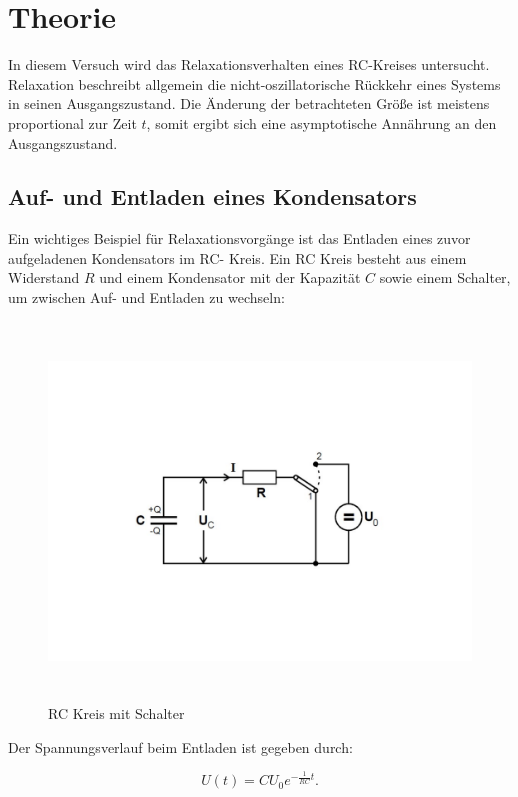 \section{Theorie}
\label{sec:Theorie}

In diesem Versuch wird das Relaxationsverhalten eines RC-Kreises untersucht.
Relaxation beschreibt allgemein die nicht-oszillatorische Rückkehr eines Systems in seinen Ausgangszustand.
Die Änderung der betrachteten Größe ist meistens proportional zur Zeit $t$, somit ergibt sich eine asymptotische
Annährung an den Ausgangszustand.

\subsection{Auf- und Entladen eines Kondensators}
Ein wichtiges Beispiel für Relaxationsvorgänge ist das Entladen eines zuvor aufgeladenen Kondensators im RC- Kreis.
Ein RC Kreis besteht aus einem Widerstand $R$ und einem Kondensator mit der Kapazität $C$ sowie einem Schalter, um zwischen 
Auf- und Entladen zu wechseln:

\begin{figure}
    \centering
    \includegraphics[height=10cm]{content/Theorie - RC-Kreis.pdf}
    \caption{RC Kreis mit Schalter}
    \label{fig:THeorie - RC_Kreis}
\end{figure}

Der Spannungsverlauf beim Entladen ist gegeben durch:

\begin{equation}
    U(t)= CU_{0}e^{-\frac{1}{RC}t} . \label{eqn:Entladen}
\end{equation}

